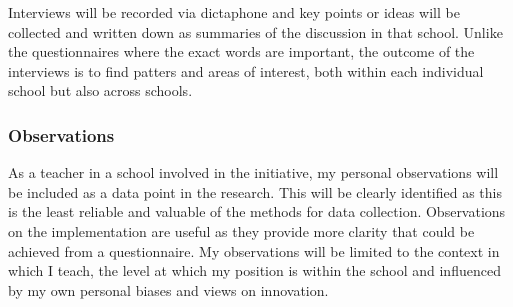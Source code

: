 Interviews will be recorded via dictaphone and key points or ideas will be collected and written down as summaries of the discussion in that school. Unlike the questionnaires where the exact words are important, the outcome of the interviews is to find patters and areas of interest, both within each individual school but also across schools.

\subsubsection{Observations}

As a teacher in a school involved in the initiative, my personal observations will be included as a data point in the research. This will be clearly identified as this is the least reliable and valuable of the methods for data collection. Observations on the implementation are useful as they provide more clarity that could be achieved from a questionnaire. My observations will be limited to the context in which I teach, the level at which my position is within the school and influenced by my own personal biases and views on innovation. 

